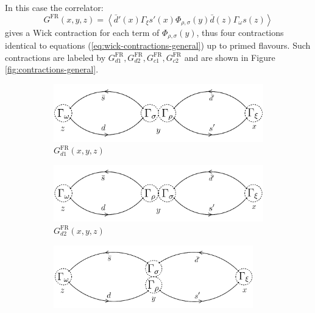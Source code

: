 \documentclass[english, LaM, oneside, noexaminfo]{sapthesis}
\newcommand{\la}{\langle}
\newcommand{\ra}{\rangle}
\begin{document}
In this case the correlator:
\begin{equation*}
    G^\text{FR}(x,y,z) = \left\la \bar d' (x) \Gamma_\xi s'(x) \Phi_{\rho,\sigma}(y) \bar d (z) \Gamma_\omega s(z) \right\ra
\end{equation*}
gives a Wick contraction for each term of $\Phi_{\rho,\sigma}(y)$, thus four contractions identical to equations (\ref{eq:wick-contractions-general}) up to primed flavours.
Such contractions are labeled by $G_{d1}^\text{FR}, G_{d2}^\text{FR}, G_{c1}^\text{FR}, G_{c2}^\text{FR}$ and are shown in Figure \ref{fig:contractions-general}.
\begin{figure}[h!]
    \centering
    \begin{subfigure}[b]{0.49\textwidth}
        \centering
        \includegraphics[width=\textwidth]{imgs-MSc-thesis/Wick_D1.png}
        \caption{$G_{d1}^\text{FR}(x,y,z)$}
    \end{subfigure}
    \begin{subfigure}[b]{0.49\textwidth}
        \centering
        \includegraphics[width=\textwidth]{imgs-MSc-thesis/Wick_D2.png}
        \caption{$G_{d2}^\text{FR}(x,y,z)$}
    \end{subfigure}
    \begin{subfigure}[b]{0.49\textwidth}
        \centering
        \includegraphics[width=0.95\textwidth]{imgs-MSc-thesis/Wick_C1.png}

\end{subfigure}
\end{figure}
\end{document}
